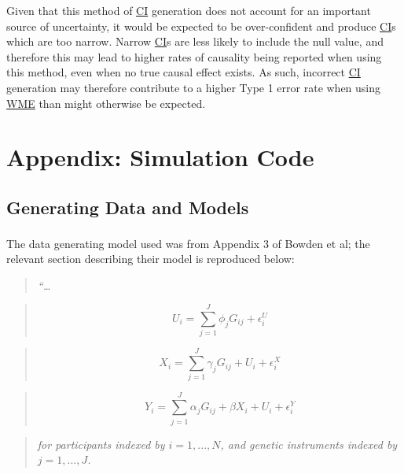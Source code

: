 \documentclass[
]{article}
\begin{document}
Given that this method of \hyperref[acronyms_CI]{CI} generation does not account for an important source of uncertainty, it would be expected to be over-confident and produce \hyperref[acronyms_CI]{CI}s which are too narrow. Narrow \hyperref[acronyms_CI]{CI}s are less likely to include the null value, and therefore this may lead to higher rates of causality being reported when using this method, even when no true causal effect exists. As such, incorrect \hyperref[acronyms_CI]{CI} generation may therefore contribute to a higher Type 1 error rate when using \hyperref[acronyms_WME]{WME} than might otherwise be expected.

\newpage

\section{Appendix: Simulation Code}\label{appendix-sim}

\subsection{Generating Data and Models}\label{appendix-sim-gen}

The data generating model used was from Appendix 3 of Bowden et al\textsuperscript{}; the relevant section describing their model is reproduced below:

\begin{quote}
\emph{``\ldots{}}
\end{quote}

\begin{quote}
\begin{equation} 
U_i = \sum^J_{j=1} \phi_jG_{ij} + \epsilon_i^U
\end{equation}
\end{quote}

\begin{quote}
\begin{equation} 
X_i = \sum^J_{j=1} \gamma_jG_{ij} + U_i + \epsilon_i^X
\end{equation}
\end{quote}

\begin{quote}
\begin{equation} 
Y_i = \sum^J_{j=1} \alpha_jG_{ij} + \beta X_i + U_i + \epsilon_i^Y
\end{equation}
\end{quote}

\begin{quote}
\emph{for participants indexed by \(i = 1, . . . , N\), and genetic instruments indexed by \(j = 1, . . . , J\).}
\end{quote}
\end{document}

